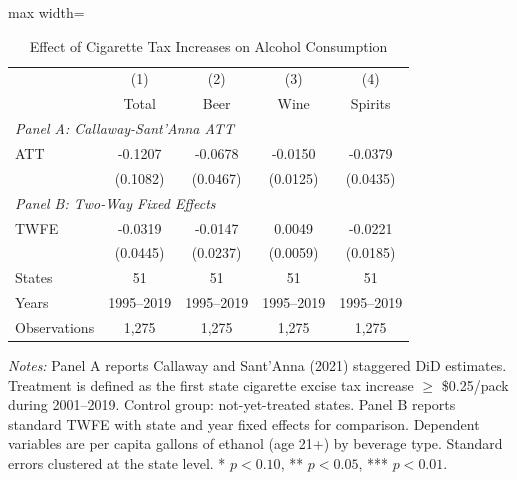 \begin{table}[H]
\centering
\caption{Effect of Cigarette Tax Increases on Alcohol Consumption}
\label{tab:main}
\begin{threeparttable}
\begin{adjustbox}{max width=\textwidth}
\begin{tabular}{lcccc}
\toprule
 & (1) & (2) & (3) & (4) \\
 & Total & Beer & Wine & Spirits \\
\midrule
\multicolumn{5}{l}{\textit{Panel A: Callaway-Sant'Anna ATT}} \\
ATT & -0.1207 & -0.0678 & -0.0150 & -0.0379 \\
 & (0.1082) & (0.0467) & (0.0125) & (0.0435) \\
\midrule
\multicolumn{5}{l}{\textit{Panel B: Two-Way Fixed Effects}} \\
TWFE & -0.0319 & -0.0147 & 0.0049 & -0.0221 \\
 & (0.0445) & (0.0237) & (0.0059) & (0.0185) \\
\midrule
States & 51 & 51 & 51 & 51 \\
Years & 1995--2019 & 1995--2019 & 1995--2019 & 1995--2019 \\
Observations & 1,275 & 1,275 & 1,275 & 1,275 \\
\bottomrule
\end{tabular}
\end{adjustbox}
\begin{tablenotes}[flushleft]
\small
\item \textit{Notes:} Panel A reports Callaway and Sant'Anna (2021) staggered DiD estimates. Treatment is defined as the first state cigarette excise tax increase $\geq$ \$0.25/pack during 2001--2019. Control group: not-yet-treated states. Panel B reports standard TWFE with state and year fixed effects for comparison. Dependent variables are per capita gallons of ethanol (age 21+) by beverage type. Standard errors clustered at the state level.
 * $p<0.10$, ** $p<0.05$, *** $p<0.01$.
\end{tablenotes}
\end{threeparttable}
\end{table}
